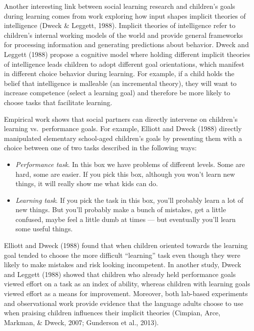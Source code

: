 \documentclass[english,floatsintext,man]{apa6}
\providecommand{\tightlist}{%
  \setlength{\itemsep}{0pt}\setlength{\parskip}{0pt}}
\theoremstyle{definition}
\theoremstyle{definition}
\theoremstyle{definition}
\theoremstyle{remark}
\begin{document}
Another interesting link between social learning research and children's
goals during learning comes from work exploring how input shapes
implicit theories of intelligence (Dweck \& Leggett, 1988). Implicit
theories of intelligence refer to children's internal working models of
the world and provide general frameworks for processing information and
generating predictions about behavior. Dweck and Leggett (1988) propose
a cognitive model where holding different implicit theories of
intelligence leads children to adopt different goal orientations, which
manifest in different choice behavior during learning. For example, if a
child holds the belief that intelligence is malleable (an incremental
theory), they will want to increase competence (select a learning goal)
and therefore be more likely to choose tasks that facilitate learning.

Empirical work shows that social partners can directly intervene on
children's learning vs.~performance goals. For example, Elliott and
Dweck (1988) directly manipulated elementary school-aged children's
goals by presenting them with a choice between one of two tasks
described in the following ways:

\begin{itemize}
\tightlist
\item
  \emph{Performance task}. In this box we have problems of different
  levels. Some are hard, some are easier. If you pick this box, although
  you won't learn new things, it will really show me what kids can do.
\item
  \emph{Learning task}. If you pick the task in this box, you'll
  probably learn a lot of new things. But you'll probably make a bunch
  of mistakes, get a little confused, maybe feel a little dumb at times
  --- but eventually you'll learn some useful things.
\end{itemize}

\noindent
Elliott and Dweck (1988) found that when children oriented towards the
learning goal tended to choose the more difficult \enquote{learning}
task even though they were likely to make mistakes and risk looking
incompetent. In another study, Dweck and Leggett (1988) showed that
children who already held performance goals viewed effort on a task as
an index of ability, whereas children with learning goals viewed effort
as a means for improvement. Moreover, both lab-based experiments and
observational work provide evidence that the language adults choose to
use when praising children influences their implicit theories (Cimpian,
Arce, Markman, \& Dweck, 2007; Gunderson et al., 2013).
\end{document}
